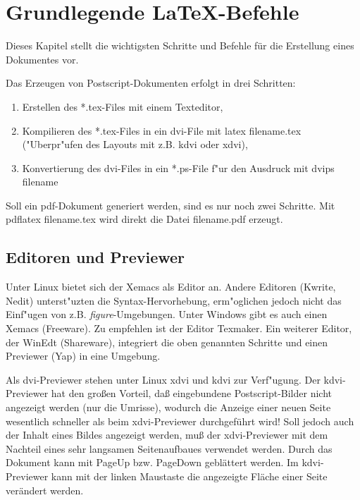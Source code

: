 \chapter{Grundlegende \LaTeX-Befehle}
\label{chap:Grundlegendes}

Dieses Kapitel stellt die wichtigsten Schritte und Befehle für die Erstellung eines
Dokumentes vor. 

Das Erzeugen von Postscript-Dokumenten erfolgt in drei Schritten:
\begin{enumerate}
\item Erstellen des *.tex-Files mit einem Texteditor,
\item Kompilieren des *.tex-Files in ein dvi-File mit {\sf latex
    filename.tex}
 ("Uberpr"ufen des Layouts mit z.B. {\sf kdvi} oder {\sf xdvi}),
\item Konvertierung des dvi-Files in ein *.ps-File f"ur den Ausdruck
  mit {\sf dvips filename}
\end{enumerate}

Soll ein pdf-Dokument generiert werden, sind es nur noch zwei
Schritte. Mit  {\sf pdflatex filename.tex} wird direkt die Datei
filename.pdf erzeugt.


\section{Editoren und Previewer}
\label{sec:Editor}

Unter Linux bietet sich der Xemacs als Editor an. Andere Editoren
(Kwrite, Nedit) unterst"uzten die Syntax-Hervorhebung, erm"oglichen jedoch
nicht das Einf"ugen von z.B. {\it figure}-Umgebungen. Unter Windows
gibt es auch einen Xemacs (Freeware). Zu empfehlen ist der Editor Texmaker. Ein weiterer Editor, der WinEdt (Shareware),
integriert die oben genannten Schritte und einen Previewer (Yap) in eine Umgebung.  

Als dvi-Previewer stehen unter Linux xdvi und kdvi zur Verf"ugung.
Der kdvi-Previewer hat den großen Vorteil, daß eingebundene Postscript-Bilder nicht angezeigt werden (nur die Umrisse), wodurch die Anzeige einer neuen Seite wesentlich schneller als beim xdvi-Previewer 
durchgeführt wird! Soll jedoch auch der Inhalt eines Bildes angezeigt werden, muß der xdvi-Previewer 
mit dem Nachteil eines sehr langsamen Seitenaufbaues verwendet werden.  
Durch das Dokument kann  
mit PageUp bzw. PageDown geblättert werden. Im kdvi-Previewer kann mit
der linken Maustaste die angezeigte  Fläche einer Seite verändert
werden.

